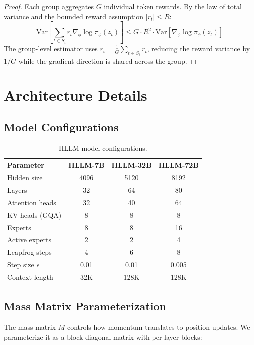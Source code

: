 \documentclass[11pt,letterpaper]{article}
\begin{document}
\begin{proof}
Each group aggregates $G$ individual token rewards. By the law of total variance and the bounded reward assumption $|r_t| \leq R$:
\[
\text{Var}\!\left[\sum_{t \in S_i} r_t \nabla_\phi \log \pi_\phi(z_t)\right] \leq G \cdot R^2 \cdot \text{Var}[\nabla_\phi \log \pi_\phi(z_t)]
\]
The group-level estimator uses $\bar{r}_i = \frac{1}{G}\sum_{t \in S_i} r_t$, reducing the reward variance by $1/G$ while the gradient direction is shared across the group.
\end{proof}

\section{Architecture Details}

\subsection{Model Configurations}

\begin{table}[t]
\centering
\begin{tabular}{lccc}
\toprule
\textbf{Parameter} & \textbf{HLLM-7B} & \textbf{HLLM-32B} & \textbf{HLLM-72B} \\
\midrule
Hidden size & 4096 & 5120 & 8192 \\
Layers & 32 & 64 & 80 \\
Attention heads & 32 & 40 & 64 \\
KV heads (GQA) & 8 & 8 & 8 \\
Experts & 8 & 8 & 16 \\
Active experts & 2 & 2 & 4 \\
Leapfrog steps & 4 & 6 & 8 \\
Step size $\epsilon$ & 0.01 & 0.01 & 0.005 \\
Context length & 32K & 128K & 128K \\
\bottomrule
\end{tabular}
\caption{HLLM model configurations.}
\label{tab:configs}
\end{table}

\subsection{Mass Matrix Parameterization}

The mass matrix $M$ controls how momentum translates to position updates. We parameterize it as a block-diagonal matrix with per-layer blocks:
\end{document}
